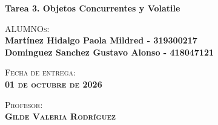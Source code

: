 \begin{titlepage}
\begin{minipage}[c][0.81\textheight][t]{0.75\textwidth}
\begin{center}
            \textbf{\Large Tarea 3. Objetos Concurrentes y Volatile} \\

            \vspace{1cm}
            
            \textsc{\Large{ALUMNOs:}}\\[0.3cm]
            \textbf{Martínez Hidalgo Paola Mildred - 319300217} \\
            \textbf{Dominguez Sanchez Gustavo Alonso - 418047121} \\
            [0.2cm]
                \vspace{1cm}
            
            \textsc{{Fecha de entrega: \\ \textbf{01 de octubre de 2026}}}\\[0.5cm]        
            \vspace{0.5cm}
            
            \textsc{{Profesor: \\ \textbf{Gilde Valeria Rodríguez}}}\\[0.5cm]  
            
            
            \vspace{0.5cm}
        \end{center}
    \end{minipage}
\end{titlepage}